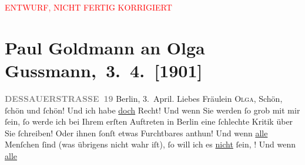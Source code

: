 
\begin{center}
            \textcolor{red}{ENTWURF, NICHT FERTIG KORRIGIERT}
                      \end{center}
            
         
         \renewcommand{\erwaehntePersonen}{Personen: Marie Glümer, Paul Goldmann, Olga Schnitzler, Elisabeth Steinrück, Ernst von Wolzogen}
         \renewcommand{\erwaehnteInstitutionen}{Institutionen: Überbrettl}
         \renewcommand{\erwaehnteOrte}{Orte: Berlin, Dessauer Straße, Wien}
         \renewcommand{\erwaehnteWerke}{}
               \section[ Paul Goldmann an Olga Gussmann, 3. 4. {[}1901{]}]{ Paul Goldmann an Olga Gussmann, 3. 4. {[}1901{]}}\nopagebreak{}\rehead{ }\begin{ledgroupsized}[t]{13cm}\normalsize\beginnumbering \toendnotes[C]{\smallbreak\pagebreak[2]} 
\toendnotes[C]{\smallbreak}\pstart
           \noindent{}\raggedleft{}{\pb}\textcolor{gray}{\textbf{DESSAUERSTRASSE 19}}\pend
           \pstart
           Berlin, 3. April.\pend
           \pstart\center{}Liebes Fräulein \textsc{Olga},\pend\pstart
           Schön, ſchön und ſchön! Und ich habe \uline{doch} Recht! Und
               wenn Sie werden ſo grob mit mir ſein, ſo werde ich bei Ihrem erſten Auftreten in Berlin eine ſchlechte Kritik über Sie ſchreiben!
               Oder ihnen ſonſt etwas Furchtbares anthun! Und wenn \uline{alle} Menſchen \label{K_L03525-1v}\label{K_L03525-1h} ſind (was übrigens nicht wahr iſt), ſo will ich es \uline{nicht} ſein, \label{K_L03525-2v}\label{K_L03525-2h}! Und wenn \uline{alle}

\end{ledgroupsized}
